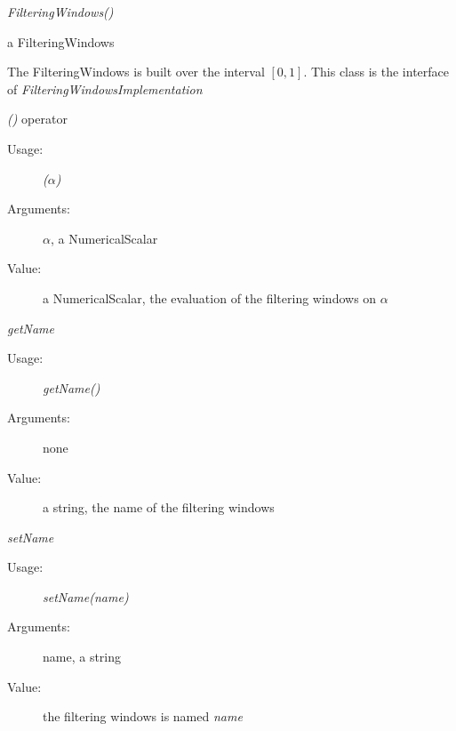 \begin{description}

\item[Usage:] \rule{0pt}{1em}
\begin{description}
\item \textit{FilteringWindows()}
\end{description}
\bigskip


\item[Value:] a FilteringWindows
\rule{0pt}{1em}
\begin{description}
\item The FilteringWindows is built over the interval $[0, 1]$. This class is the interface of \textit{FilteringWindowsImplementation}
\end{description}
\bigskip

\item[Some methods :]  \rule{0pt}{1em}

\begin{description}

\item \textit{()} operator
\begin{description}
\item[Usage:] \textit{($\alpha$)}
\item[Arguments:] \textit{$\alpha$}, a NumericalScalar
\item[Value:]  a NumericalScalar, the evaluation of the filtering windows on $\alpha$
\end{description}
\bigskip

\item \textit{getName}
\begin{description}
\item[Usage:] \textit{getName()}
\item[Arguments:] none
\item[Value:]  a string, the name of the filtering windows
\end{description}
\bigskip

\item \textit{setName}
\begin{description}
\item[Usage:] \textit{setName(name)}
\item[Arguments:] name, a string
\item[Value:]  the filtering windows is named \textit{name}
\end{description}
\bigskip

\end{description}


\end{description}

